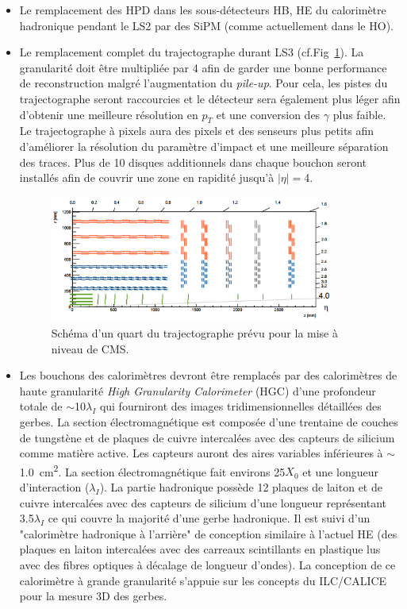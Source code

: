 \begin{itemize}[label=$\bullet$]
	\item Le remplacement des HPD dans les sous-détecteurs HB, HE du calorimètre hadronique pendant le LS2 par des SiPM (comme actuellement dans le HO).
	\item Le remplacement complet du trajectographe durant LS3 (cf.Fig~\ref{tracker2}). La granularité doit être multipliée par \num{4} afin de garder une bonne performance de reconstruction malgré l'augmentation du \textit{pile-up}. Pour cela, les pistes du trajectographe seront raccourcies et le détecteur sera également plus léger afin d'obtenir une meilleure résolution en $p_{T}$ et une conversion des $\gamma$ plus faible. Le trajectographe à pixels aura des pixels et des senseurs plus petits afin d'améliorer la résolution du paramètre d'impact et une meilleure séparation des traces. Plus de \num{10} disques additionnels dans chaque bouchon seront installés afin de couvrir une zone en rapidité jusqu'à $|\eta|=$\num{4}.
	\begin{figure}[ht!]
		\centering
		\includegraphics[width=0.88\textwidth]{CMS/tracker2.png}
		\captionsetup{type=figure}\caption{Schéma d'un quart du trajectographe prévu pour la mise à niveau de CMS.}
		\label{tracker2}
	\end{figure}
	\item Les bouchons des calorimètres devront être remplacés par des calorimètres de haute granularité \textit{High Granularity Calorimeter} (HGC) d'une profondeur totale de $\sim$\num{10}$\lambda_{I}$ qui fourniront des images tridimensionnelles détaillées des gerbes. La section électromagnétique est composée d'une trentaine de couches de tungstène et de plaques de cuivre intercalées avec des capteurs de silicium comme matière active. Les capteurs auront des aires variables inférieures à $\sim$\SI{1,0}{\square\centi\meter}. La section électromagnétique fait environs \num{25}$X_0$ et une longueur d'interaction ($\lambda_{I}$). La partie hadronique possède \num{12} plaques de laiton et de cuivre intercalées avec des capteurs de silicium d'une longueur représentant \num{3,5}$\lambda_{I}$ ce qui couvre la majorité d'une gerbe hadronique. Il est suivi d'un "calorimètre hadronique à l'arrière" de conception similaire à l'actuel HE (des plaques en laiton intercalées avec des carreaux scintillants en plastique lus avec des fibres optiques à décalage de longueur d'ondes). La conception de ce calorimètre à grande granularité s'appuie sur les concepts du ILC/CALICE pour la mesure 3D des gerbes.

\end{itemize}

